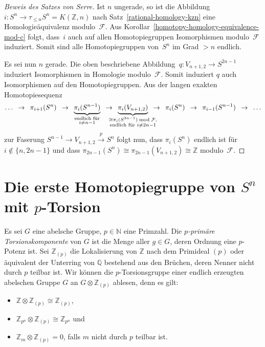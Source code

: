\documentclass[11pt, a4paper, german]{article}
\theoremstyle{definition}
\theoremstyle{remark}
\newcommand{\R}{\mathbb{R}} %
\newcommand{\N}{\mathbb{N}} %
\newcommand{\Z}{\mathbb{Z}} %
\newcommand{\Q}{\mathbb{Q}} %
\newcommand{\F}{\mathcal{F}} %
\newcommand{\V}[2]{V_{{#2},{#1}}} %
\begin{document}
\begin{proof}[Beweis des Satzes von Serre]
  Ist $n$ ungerade, so ist die Abbildung $i : S^n \to \tau_{\leq n} S^n = K(\Z, n)$ nach Satz~\ref{rational-homology-kzn} eine Homologieäquivalenz modulo~$\F$.
  Aus Korollar~\ref{homotopy-homology-equivalence-mod-c} folgt, dass~$i$ auch auf allen Homotopiegruppen Isomorphismen modulo~$\F$ induziert.
  Somit sind alle Homotopiegruppen von~$S^n$ im Grad $> n$ endlich.

  Es sei nun $n$ gerade.
  Die oben beschriebene Abbildung~$q : \V{2}{n+1} \to S^{2n-1}$ induziert Isomorphismen in Homologie modulo~$\F$.
  Somit induziert $q$ auch Isomorphismen auf den Homotopiegruppen.
  Aus der langen exakten Homotopiesequenz
  \[
    \ldots
    \enspace\to\enspace
    \pi_{i+1}(S^n)
    \enspace\to\enspace
    \underbrace{\pi_i(S^{n-1})}_{\substack{\text{endlich für} \\ i \neq n-1}}
    \enspace\to\enspace \underbrace{\pi_i(\V{2}{n+1})}_{\mathclap{\substack{\cong \pi_i(S^{2n-1}) \bmod{\F}, \\ \text{endlich für } i \neq 2n-1}}}
    \enspace\to\enspace
    \pi_i(S^n)
    \enspace\to\enspace
    \pi_{i-1}(S^{n-1})
    \enspace\to\enspace
    \ldots
  \]
  zur Faserung $S^{n-1} \to \V{2}{n+1} \xrightarrow{p} S^n$ folgt nun, dass $\pi_i(S^n)$ endlich ist für $i \not\in \{ n, 2n-1 \}$ und dass $\pi_{2n-1}(S^n) \cong \pi_{2n-1}(\V{2}{n+1}) \cong \Z$ modulo~$\F$.
\end{proof}

\section{Die erste Homotopiegruppe von $S^n$ mit $p$-Torsion}


Es sei $G$ eine abelsche Gruppe, $p \in \N$ eine Primzahl.
Die \emph{$p$-primäre Torsionskomponente} von $G$ ist die Menge aller $g \in G$, deren Ordnung eine $p$-Potenz ist.
Sei $\Z_{(p)}$ die Lokalisierung von $\Z$ nach dem Primideal $(p)$ oder äquivalent der Unterring von $\Q$ bestehend aus den Brüchen, deren Nenner nicht durch $p$ teilbar ist.
Wir können die $p$-Torsionsgruppe einer endlich erzeugten abelschen Gruppe $G$ an $G \otimes \Z_{(p)}$ ablesen, denn es gilt:
\begin{itemize}
  \item $\Z \otimes \Z_{(p)} \cong \Z_{(p)}$,
  \item $\Z_{p^n} \otimes \Z_{(p)} \cong \Z_{p^n}$ und
  \item $\Z_m \otimes \Z_{(p)} = 0$, falls $m$ nicht durch $p$ teilbar ist.
\end{itemize}
\end{document}

